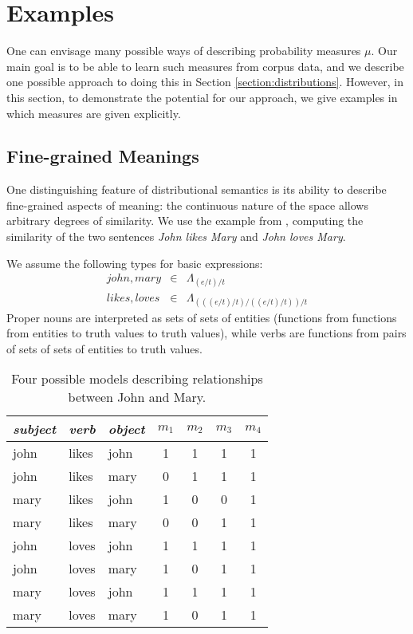\documentclass[letterpaper]{article}
\begin{document}

\section{Examples}

One can envisage many possible ways of describing probability measures
$\mu$. Our main goal is to be able to learn such measures from corpus
data, and we describe one possible approach to doing this in Section
\ref{section:distributions}. However, in this section, to demonstrate
the potential for our approach, we give examples in which measures are
given explicitly.
 
\subsection{Fine-grained Meanings}

One distinguishing feature of distributional semantics is its ability
to describe fine-grained aspects of meaning: the continuous nature of
the space allows arbitrary degrees of similarity. We use the example
from \cite{Clark:08}, computing the similarity of the two sentences
\emph{John likes Mary} and \emph{John loves Mary}.

We assume the following types for basic expressions:
\begin{eqnarray*}
\mathit{john},\mathit{mary} & \in & \Lambda_{(e/t)/t}\\
\mathit{likes}, \mathit{loves} & \in & \Lambda_{(((e/t)/t)/((e/t)/t))/t}
\end{eqnarray*}
Proper nouns are interpreted as sets of sets of entities (functions
from functions from entities to truth values to truth values), while
verbs are functions from pairs of sets of sets of entities to truth
values.

\begin{table}
\begin{center}
\begin{tabular}{|l|l|l||c|c|c|c|}
\hline
\emph{subject} & \emph{verb} & \emph{object} & $m_1$ & $m_2$ & $m_3$ & $m_4$\\
\hline
john & likes & john & 1 & 1 & 1 & 1\\
john & likes & mary & 0 & 1 & 1 & 1\\
mary & likes & john & 1 & 0 & 0 & 1\\
mary & likes & mary & 0 & 0 & 1 & 1\\
john & loves & john & 1 & 1 & 1 & 1\\
john & loves & mary & 1 & 0 & 1 & 1\\
mary & loves & john & 1 & 1 & 1 & 1\\
mary & loves & mary & 1 & 0 & 1 & 1\\
\hline
\end{tabular}
\caption{Four possible models describing relationships between John
  and Mary.}
\end{center}
\label{table:models}
\end{table}
\end{document}
